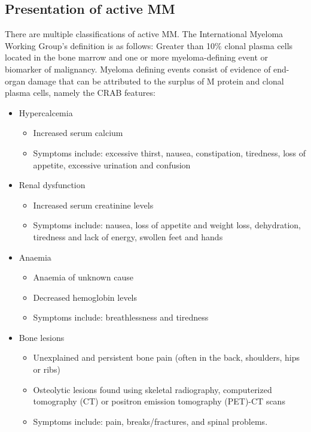 \subsection{Presentation of active MM}
There are multiple classifications of active MM.
The International Myeloma Working Group's definition\cite{rajkumar2014international} is as follows:
Greater than 10\% clonal plasma cells located in the bone marrow and one or more myeloma-defining event or biomarker of malignancy.
Myeloma defining events consist of evidence of end-organ damage that can be attributed to the surplus of M protein and clonal plasma cells, namely the CRAB features:
%
\begin{itemize}
  \item Hypercalcemia
    \begin{itemize}
        \item Increased serum calcium
        \item Symptoms include: excessive thirst, nausea, constipation, tiredness, loss of appetite, excessive urination and confusion
    \end{itemize}
  \item Renal dysfunction
    \begin{itemize}
        \item Increased serum creatinine levels
        \item Symptoms include: nausea, loss of appetite and weight loss, dehydration, tiredness and lack of energy, swollen feet and hands
    \end{itemize}
  \item Anaemia
    \begin{itemize}
        \item Anaemia of unknown cause
        \item Decreased hemoglobin levels
        \item Symptoms include: breathlessness and tiredness
    \end{itemize}
    \item Bone lesions
      \begin{itemize}
        \item Unexplained and persistent bone pain (often in the back, shoulders, hips or ribs)
        \item Osteolytic lesions found using skeletal radiography, computerized tomography (CT) or positron emission tomography (PET)-CT scans
        \item Symptoms include: pain, breaks/fractures, and spinal problems.
      \end{itemize}
\end{itemize}
%

